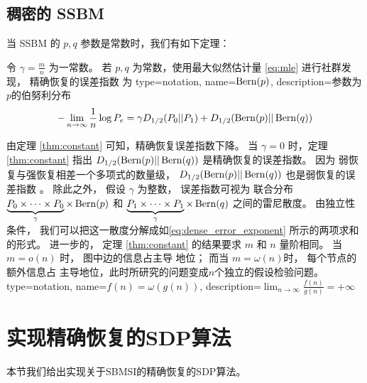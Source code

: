 \subsection{稠密的 SSBM}
当 SSBM 的 $p,q$ 参数是常数时，我们有如下定理：
\begin{theorem}\label{thm:constant}
	令 $\gamma = \frac{m}{n}$ 为一常数。
    若 $p,q$ 为常数，使用最大似然估计量 \eqref{eq:mle}
    进行社群发现，
	精确恢复的误差指数
    为
{
  type=notation,
  name={$\operatorname{Bern}(p)$},
  description={参数为$p$的伯努利分布}
}
	\begin{equation}\label{eq:dense_error_exponent}
	-\lim_{n\to \infty} \frac{1}{n}\log P_e = 
     \gamma D_{1/2}(P_0 || P_1) + D_{1/2}(\operatorname{Bern}(p)||\operatorname{Bern}(q))
	\end{equation} 
\end{theorem}

由定理 \ref{thm:constant} 可知，精确恢复误差指数下降。
当 $\gamma=0$ 时，定理 \ref{thm:constant} 指出
$D_{1/2}(\operatorname{Bern}(p)||\operatorname{Bern}(q))$
是精确恢复的误差指数。
因为
弱恢复与强恢复相差一个多项式的数量级，
$D_{1/2}(\operatorname{Bern}(p)||\operatorname{Bern}(q))$ 也是弱恢复的误差指数
\cite{zhang2016}。
除此之外， 假设 $\gamma$ 为整数，
误差指数可视为 
联合分布
$\underbrace{P_0\times \dots \times P_0}_{\gamma} \times \operatorname{Bern}(p)$
和 $\underbrace{P_1\times \dots \times P_1}_{\gamma} \times \operatorname{Bern}(q)$
之间的雷尼散度。
由独立性条件，
我们可以把这一散度分解成如\eqref{eq:dense_error_exponent}
所示的两项求和的形式。
进一步的， 定理 \ref{thm:constant}
的结果要求
$m$ 和 $n$ 量阶相同。
当 $m=o(n)$ 时，
图中边的信息占主导
地位；
而当 $m=\omega(n)$时，
每个节点的额外信息占
主导地位，此时所研究的问题变成$n$个独立的假设检验问题。
{
  type=notation,
  name={$f(n)=\omega(g(n))$},
  description={$\lim_{n\to \infty} \frac{f(n)}{g(n)} = +\infty$}
}

\section{实现精确恢复的SDP算法}
本节我们给出实现关于SBMSI的精确恢复的SDP算法。

